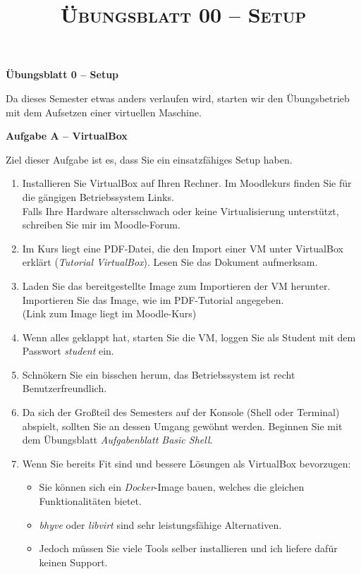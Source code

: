 \documentclass[paper=a4,fontsize=11pt]{scrartcl}%
\title{	
\normalfont \normalsize 
\textsc{Übungsblatt 00 -- Setup}
}
\numberwithin{equation}{section}
\begin{document}
\begin{center}\Large{\textbf{Übungsblatt 0 -- Setup}}\end{center}

Da dieses Semester etwas anders verlaufen wird, starten wir den Übungsbetrieb mit dem Aufsetzen einer virtuellen Maschine. 
\begin{center}\Large{\textbf{Aufgabe A -- VirtualBox}}\end{center}\vskip0.25in
Ziel dieser Aufgabe ist es, dass Sie ein einsatzfähiges Setup haben.
\begin{enumerate}
	\item Installieren Sie VirtualBox auf Ihren Rechner. Im Moodlekurs finden Sie für die gängigen Betriebssystem Links.\\
	Falls Ihre Hardware altersschwach oder keine Virtualisierung unterstützt, schreiben Sie mir im Moodle-Forum.
	\item Im Kurs liegt eine PDF-Datei, die den Import einer VM unter VirtualBox erklärt (\emph{Tutorial VirtualBox}). Lesen Sie das Dokument aufmerksam.
	\item Laden Sie das bereitgestellte Image zum Importieren der VM herunter. Importieren Sie das Image, wie im PDF-Tutorial angegeben.\\
	(Link zum Image liegt im Moodle-Kurs)
	\item Wenn alles geklappt hat, starten Sie die VM, loggen Sie als Student mit dem Passwort \emph{student} ein.
	\item Schnökern Sie ein bisschen herum, das Betriebssystem ist recht Benutzerfreundlich.
	\item Da sich der Großteil des Semesters auf der Konsole (Shell oder Terminal) abspielt, sollten Sie an dessen Umgang gewöhnt werden. Beginnen Sie mit dem Übungsblatt \emph{Aufgabenblatt Basic Shell}.
	\item Wenn Sie bereits Fit sind und bessere Lösungen als VirtualBox bevorzugen:
	\begin{itemize}
		\item Sie können sich ein \emph{Docker}-Image bauen, welches die gleichen Funktionalitäten bietet.
		\item \emph{bhyve} oder \emph{libvirt} sind sehr leistungsfähige Alternativen.
		\item Jedoch müssen Sie viele Tools selber installieren und ich liefere dafür keinen Support.
	\end{itemize}
\end{enumerate}
\end{document}
